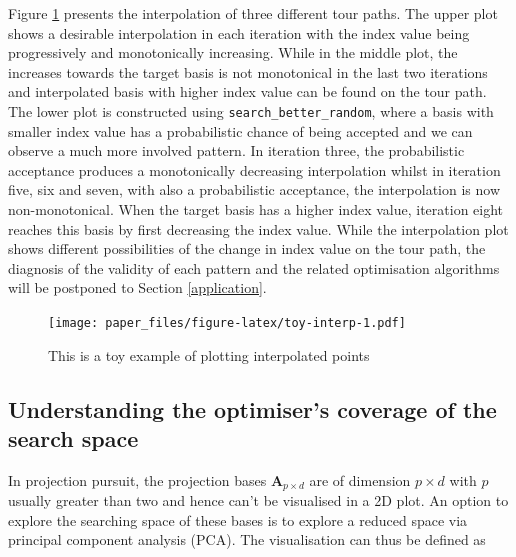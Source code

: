 \documentclass[12pt]{article}
\begin{document}
Figure \ref{toy-interp} presents the interpolation of three different
tour paths. The upper plot shows a desirable interpolation in each
iteration with the index value being progressively and monotonically
increasing. While in the middle plot, the increases towards the target
basis is not monotonical in the last two iterations and interpolated
basis with higher index value can be found on the tour path. The lower
plot is constructed using \texttt{search\_better\_random}, where a basis
with smaller index value has a probabilistic chance of being accepted
and we can observe a much more involved pattern. In iteration three, the
probabilistic acceptance produces a monotonically decreasing
interpolation whilst in iteration five, six and seven, with also a
probabilistic acceptance, the interpolation is now non-monotonical. When
the target basis has a higher index value, iteration eight reaches this
basis by first decreasing the index value. While the interpolation plot
shows different possibilities of the change in index value on the tour
path, the diagnosis of the validity of each pattern and the related
optimisation algorithms will be postponed to Section \ref{application}.

\begin{figure}
\centering
\texttt{[image: paper\_files/figure-latex/toy-interp-1.pdf]}
\caption{\label{toy-interp} This is a toy example of plotting
interpolated points}
\end{figure}

\newpage

\hypertarget{understanding-the-optimisers-coverage-of-the-search-space}{%
\subsection{Understanding the optimiser's coverage of the search
space}\label{understanding-the-optimisers-coverage-of-the-search-space}}

In projection pursuit, the projection bases \(\mathbf{A}_{p \times d}\)
are of dimension \(p \times d\) with \(p\) usually greater than two and
hence can't be visualised in a 2D plot. An option to explore the
searching space of these bases is to explore a reduced space via
principal component analysis (PCA). The visualisation can thus be
defined as
\end{document}

